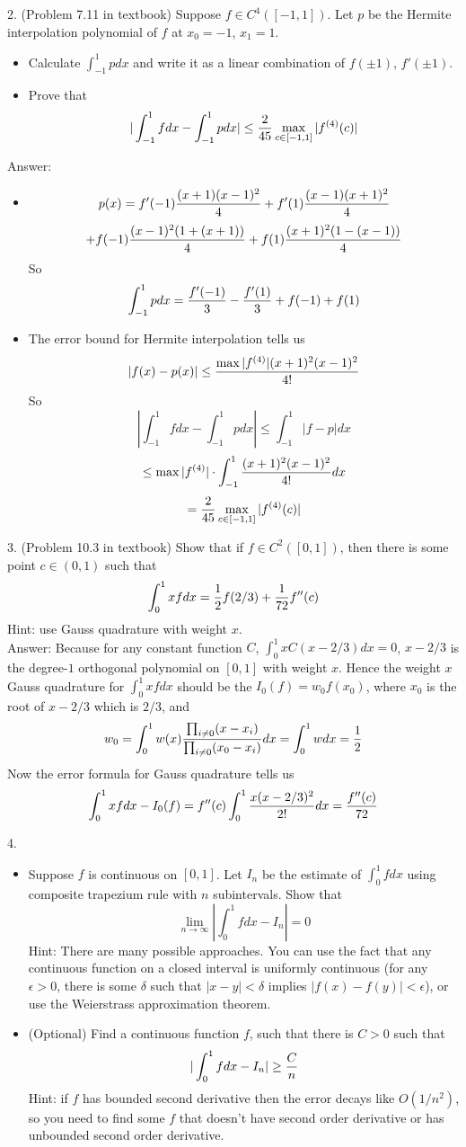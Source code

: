 \documentclass[20pt]{article} %
\theoremstyle{break}
\begin{document}
2. (Problem 7.11 in textbook) Suppose $f\in C^4([-1, 1])$. Let $p$ be the Hermite interpolation polynomial of $f$ at $x_0=-1$, $x_1=1$.
\begin{itemize}
\item Calculate $\int_{-1}^1pdx$ and write it as a linear combination of $f(\pm 1)$, $f'(\pm 1)$.
\item Prove that
  \[|\int_{-1}^1fdx-\int_{-1}^1pdx|\leq {2\over 45}\max_{c\in [-1, 1]}|f^{(4)}(c)|\]
\end{itemize}

Answer:
\begin{itemize}
\item
  \[p(x)=f'(-1){(x+1)(x-1)^2\over 4}+f'(1){(x-1)(x+1)^2\over 4}\]
  \[+f(-1){(x-1)^2(1+(x+1))\over 4}+f(1){(x+1)^2(1-(x-1))\over 4}\]
  So
  \[\int_{-1}^1 pdx={f'(-1)\over 3}-{f'(1)\over 3}+f(-1)+f(1)\]
\item The error bound for Hermite interpolation tells us
  \[|f(x)-p(x)|\leq {\max|f^{(4)}|(x+1)^2(x-1)^2\over 4!}\]
  So
  \[|\int_{-1}^1fdx-\int_{-1}^1pdx|\leq \int_{-1}^1|f-p|dx\]
  \[\leq \max|f^{(4)}|\cdot \int_{-1}^1 {(x+1)^2(x-1)^2\over 4!}dx\]
    \[={2\over 45}\max_{c\in [-1, 1]}|f^{(4)}(c)|\]
\end{itemize}



3. (Problem 10.3 in textbook) Show that if $f\in C^2([0, 1])$, then there is some point $c\in (0, 1)$ such that
\[\int_0^1xfdx={1\over 2}f(2/3)+{1\over 72}f''(c)\]
Hint: use Gauss quadrature with weight $x$.\\

Answer: Because for any constant function $C$, $\int_0^1xC(x-2/3)dx=0$, $x-2/3$ is the degree-$1$ orthogonal polynomial on $[0, 1]$ with weight $x$. Hence the weight $x$ Gauss quadrature for $\int_0^1xfdx$ should be the $I_0(f)=w_0f(x_0)$, where $x_0$ is the root of $x-2/3$ which is $2/3$, and
\[w_0=\int_0^1w(x){\prod_{i\not=0}(x-x_i)\over \prod_{i\not=0}(x_0-x_i)}dx=\int_0^1wdx={1\over 2}\]
Now the error formula for Gauss quadrature tells us
\[\int_0^1xfdx-I_0(f)=f''(c)\int_0^1{x(x-2/3)^2\over 2!}dx={f''(c)\over 72}\]

4. \begin{itemize}
\item Suppose $f$ is continuous on $[0, 1]$. Let $I_n$ be the estimate of $\int_0^1fdx$ using composite trapezium rule with $n$ subintervals. Show that
  \[\lim_{n\rightarrow\infty}|\int_0^1fdx-I_n|=0\]
 Hint: There are many possible approaches. You can use the fact that any continuous function on a closed interval is uniformly continuous (for any $\epsilon>0$, there is some $\delta$ such that $|x-y|<\delta$ implies $|f(x)-f(y)|<\epsilon$), or use the Weierstrass approximation theorem.
\item (Optional) Find a continuous function $f$, such that there is $C>0$ such that 
  \[|\int_0^1fdx-I_n|\geq {C\over n}\]
  Hint: if $f$ has bounded second derivative then the error decays like $O(1/n^2)$, so you need to find some $f$ that doesn't have second order derivative or has unbounded second order derivative.
\end{itemize}
\end{document}
